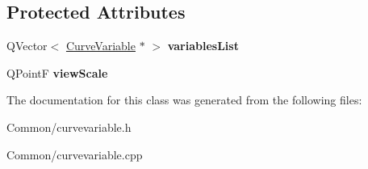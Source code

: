 \subsection*{\-Protected \-Attributes}
\begin{DoxyCompactItemize}
\item 
\hypertarget{class_curve_variable_list_model_a7088cc4830a89250bd604041c619b65a}{
\-Q\-Vector$<$ \hyperlink{class_curve_variable}{\-Curve\-Variable} $\ast$ $>$ {\bfseries variables\-List}}
\label{class_curve_variable_list_model_a7088cc4830a89250bd604041c619b65a}

\item 
\hypertarget{class_curve_variable_list_model_a8a973f9db4a8b0eafe08d4f16325ebf8}{
\-Q\-Point\-F {\bfseries view\-Scale}}
\label{class_curve_variable_list_model_a8a973f9db4a8b0eafe08d4f16325ebf8}

\end{DoxyCompactItemize}


\-The documentation for this class was generated from the following files\-:\begin{DoxyCompactItemize}
\item 
\-Common/curvevariable.\-h\item 
\-Common/curvevariable.\-cpp\end{DoxyCompactItemize}
